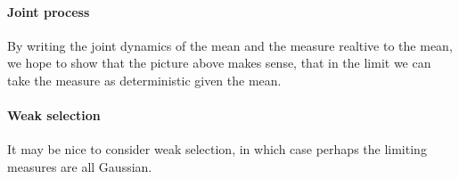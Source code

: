 \documentclass{article}
\begin{document}
\paragraph{Joint process}
By writing the joint dynamics of the mean and the measure realtive to the mean,
we hope to show that the picture above makes sense,
that in the limit we can take the measure as deterministic given the mean.

\paragraph{Weak selection}
It may be nice to consider weak selection,
in which case perhaps the limiting measures are all Gaussian.
\end{document}
